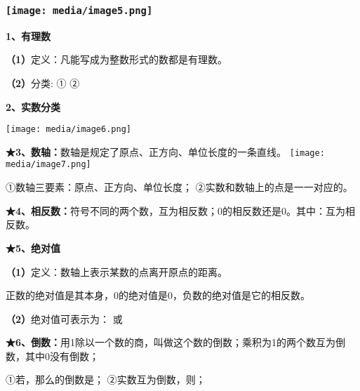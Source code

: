 \documentclass[a4paper,11pt,UTF8]{ctexart}
\begin{document}
\hypertarget{ux5b66ux79d1ux7f51www.zxxk.com--ux6559ux80b2ux8d44ux6e90ux95e8ux6237ux63d0ux4f9bux8bd5ux9898ux8bd5ux5377ux6559ux6848ux8bfeux4ef6ux6559ux5b66ux8bbaux6587ux7d20ux6750ux7b49ux5404ux7c7bux6559ux5b66ux8d44ux6e90ux5e93ux4e0bux8f7dux8fd8ux6709ux5927ux91cfux4e30ux5bccux7684ux6559ux5b66ux8d44ux8baf}{%
\subsubsection{\texorpdfstring{\protect\texttt{[image: media/image5.png]}}{学科网(www.zxxk.com)-\/-教育资源门户，提供试题试卷、教案、课件、教学论文、素材等各类教学资源库下载，还有大量丰富的教学资讯！}}\label{ux5b66ux79d1ux7f51www.zxxk.com--ux6559ux80b2ux8d44ux6e90ux95e8ux6237ux63d0ux4f9bux8bd5ux9898ux8bd5ux5377ux6559ux6848ux8bfeux4ef6ux6559ux5b66ux8bbaux6587ux7d20ux6750ux7b49ux5404ux7c7bux6559ux5b66ux8d44ux6e90ux5e93ux4e0bux8f7dux8fd8ux6709ux5927ux91cfux4e30ux5bccux7684ux6559ux5b66ux8d44ux8baf}}

\textbf{1、有理数}

\textbf{（1）}定义：凡能写成为整数形式的数都是有理数。

\textbf{（2）}分类: ① ②

\textbf{2、实数分类}

\texttt{[image: media/image6.png]}

\textbf{★3、数轴：}数轴是规定了原点、正方向、单位长度的一条直线。
\texttt{[image: media/image7.png]}

①数轴三要素：原点、正方向、单位长度； ②实数和数轴上的点是一一对应的。

\textbf{★4、相反数：}符号不同的两个数，互为相反数；0的相反数还是0。其中：互为相反数。

\textbf{★5、绝对值}

\textbf{（1）}定义：数轴上表示某数的点离开原点的距离。

正数的绝对值是其本身，0的绝对值是0，负数的绝对值是它的相反数。

\textbf{（2）}绝对值可表示为： 或

\textbf{★6、倒数：}用1除以一个数的商，叫做这个数的倒数；乘积为1的两个数互为倒数，其中0没有倒数；

①若，那么的倒数是； ②实数互为倒数，则；
\end{document}
